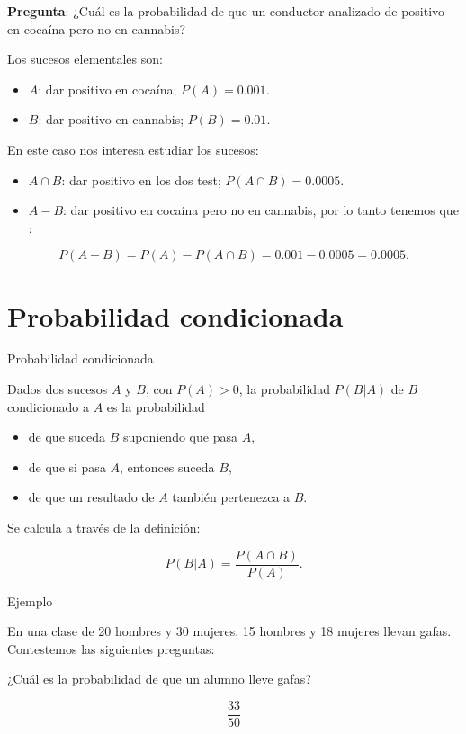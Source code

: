 \documentclass[
  letterpaper,
  DIV=11,
  numbers=noendperiod]{scrreprt}
\providecommand{\tightlist}{%
  \setlength{\itemsep}{0pt}\setlength{\parskip}{0pt}}\usepackage{longtable,booktabs,array}
\begin{document}
\textbf{Pregunta}: ¿Cuál es la probabilidad de que un conductor
analizado de positivo en cocaína pero no en cannabis?

Los sucesos elementales son:

\begin{itemize}
\tightlist
\item
  \(A\): dar positivo en cocaína; \(P(A)=0.001.\)
\item
  \(B\): dar positivo en cannabis; \(P(B)=0.01.\)
\end{itemize}

En este caso nos interesa estudiar los sucesos:

\begin{itemize}
\tightlist
\item
  \(A\cap B\): dar positivo en los dos test; \(P(A\cap B)=0.0005.\)
\item
  \(A-B\): dar positivo en cocaína pero no en cannabis, por lo tanto
  tenemos que :
\end{itemize}

\[P(A-B) =P(A)-P(A\cap B) =0.001-0.0005=0.0005.\]

\section{Probabilidad condicionada}\label{probabilidad-condicionada}

Probabilidad condicionada

Dados dos sucesos \(A\) y \(B\), con \(P(A)>0\), la probabilidad
\(P(B|A)\) de \(B\) condicionado a \(A\) es la probabilidad

\begin{itemize}
\tightlist
\item
  de que suceda \(B\) suponiendo que pasa \(A\),
\item
  de que si pasa \(A\), entonces suceda \(B\),
\item
  de que un resultado de \(A\) también pertenezca a \(B\).
\end{itemize}

Se calcula a través de la definición:

\[
P(B|A)=\frac{P(A\cap B)}{P(A)}.
\]

Ejemplo

En una clase de 20 hombres y 30 mujeres, 15 hombres y 18 mujeres llevan
gafas. Contestemos las siguientes preguntas:

¿Cuál es la probabilidad de que un alumno lleve gafas?

\[
\frac{33}{50}
\]
\end{document}
